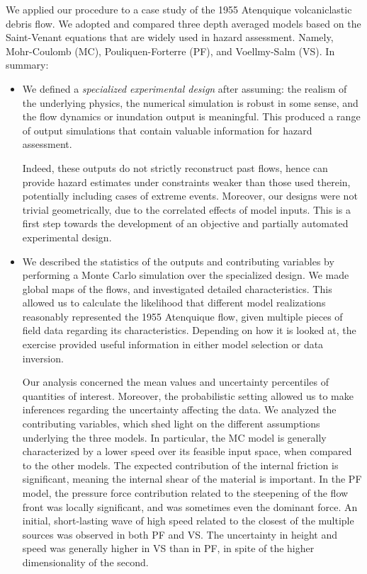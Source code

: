 \documentclass[nhess, manuscript]{copernicus}
\begin{document}
We applied our procedure to a case study of the 1955 Atenquique volcaniclastic debris flow. We adopted and compared three depth averaged models based on the Saint-Venant equations that are widely used in hazard assessment. Namely, Mohr-Coulomb (MC), Pouliquen-Forterre (PF), and Voellmy-Salm (VS). In summary:
\begin{itemize}
  \item We defined a \emph{specialized experimental design} after assuming: the realism of the underlying physics, the numerical simulation is robust in some sense, and the flow dynamics or inundation output is meaningful. This produced a range of output simulations that contain valuable information for hazard assessment.

      Indeed, these outputs do not strictly reconstruct past flows, hence can provide hazard estimates under constraints weaker than those used therein, potentially including  cases of extreme events. Moreover, our designs were not trivial geometrically, due to the correlated effects of model inputs. This is a first step towards the development of an objective and partially automated experimental design.

  \item We described the statistics of the outputs and contributing variables by performing a Monte Carlo simulation over the specialized design. We made global maps of the flows, and investigated detailed characteristics. This allowed us to calculate the likelihood that different model realizations reasonably represented the 1955 Atenquique flow, given multiple pieces of field data regarding its characteristics.  Depending on how it is looked at, the exercise provided useful information in either model selection or data inversion.

      Our analysis concerned the mean values and uncertainty percentiles of quantities of interest. Moreover, the probabilistic setting allowed us to make inferences regarding the uncertainty affecting the data. We analyzed the contributing variables, which shed light on the different assumptions underlying the three models. In particular, the MC model is generally characterized by a lower speed over its feasible input space, when compared to the other models. The expected contribution of the internal friction is significant, meaning the internal shear of the material is important. In the PF model, the pressure force contribution related to the steepening of the flow front was locally significant, and was sometimes even the dominant force. An initial, short-lasting wave of high speed related to the closest of the multiple sources was observed in both PF and VS. The uncertainty in height and speed was generally higher in VS than in PF, in spite of the higher dimensionality of the second.


\end{itemize}
\end{document}
